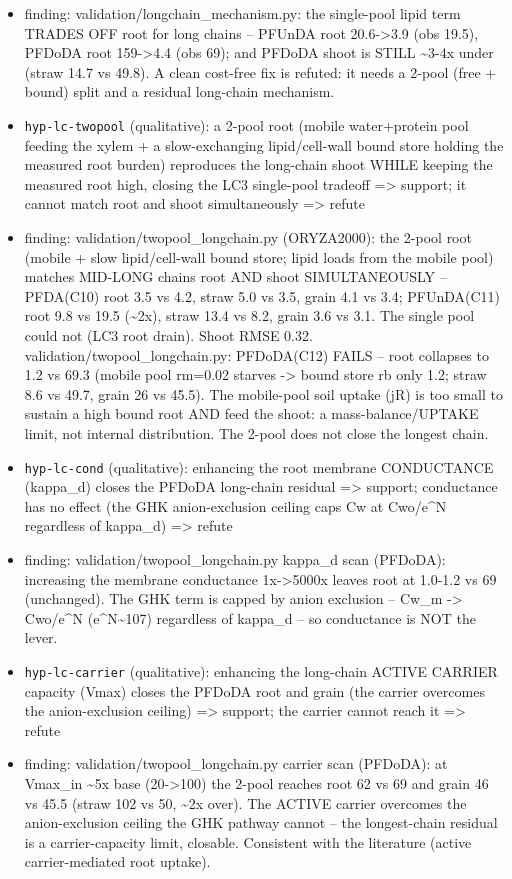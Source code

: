 \documentclass{article}
\begin{document}
\begin{itemize}
  \item finding: validation/longchain\_mechanism.py: the single-pool lipid term TRADES OFF root for long chains -- PFUnDA root 20.6->3.9 (obs 19.5), PFDoDA root 159->4.4 (obs 69); and PFDoDA shoot is STILL \textasciitilde{}3-4x under (straw 14.7 vs 49.8). A clean cost-free fix is refuted: it needs a 2-pool (free + bound) split and a residual long-chain mechanism.
  \item \texttt{hyp-lc-twopool} (qualitative): a 2-pool root (mobile water+protein pool feeding the xylem + a slow-exchanging lipid/cell-wall bound store holding the measured root burden) reproduces the long-chain shoot WHILE keeping the measured root high, closing the LC3 single-pool tradeoff => support; it cannot match root and shoot simultaneously => refute
  \item finding: validation/twopool\_longchain.py (ORYZA2000): the 2-pool root (mobile + slow lipid/cell-wall bound store; lipid loads from the mobile pool) matches MID-LONG chains root AND shoot SIMULTANEOUSLY -- PFDA(C10) root 3.5 vs 4.2, straw 5.0 vs 3.5, grain 4.1 vs 3.4; PFUnDA(C11) root 9.8 vs 19.5 (\textasciitilde{}2x), straw 13.4 vs 8.2, grain 3.6 vs 3.1. The single pool could not (LC3 root drain). Shoot RMSE 0.32.
validation/twopool\_longchain.py: PFDoDA(C12) FAILS -- root collapses to 1.2 vs 69.3 (mobile pool rm=0.02 starves -> bound store rb only 1.2; straw 8.6 vs 49.7, grain 26 vs 45.5). The mobile-pool soil uptake (jR) is too small to sustain a high bound root AND feed the shoot: a mass-balance/UPTAKE limit, not internal distribution. The 2-pool does not close the longest chain.
  \item \texttt{hyp-lc-cond} (qualitative): enhancing the root membrane CONDUCTANCE (kappa\_d) closes the PFDoDA long-chain residual => support; conductance has no effect (the GHK anion-exclusion ceiling caps Cw at Cwo/e\textasciicircum{}N regardless of kappa\_d) => refute
  \item finding: validation/twopool\_longchain.py kappa\_d scan (PFDoDA): increasing the membrane conductance 1x->5000x leaves root at 1.0-1.2 vs 69 (unchanged). The GHK term is capped by anion exclusion -- Cw\_m -> Cwo/e\textasciicircum{}N (e\textasciicircum{}N\textasciitilde{}107) regardless of kappa\_d -- so conductance is NOT the lever.
  \item \texttt{hyp-lc-carrier} (qualitative): enhancing the long-chain ACTIVE CARRIER capacity (Vmax) closes the PFDoDA root and grain (the carrier overcomes the anion-exclusion ceiling) => support; the carrier cannot reach it => refute
  \item finding: validation/twopool\_longchain.py carrier scan (PFDoDA): at Vmax\_in \textasciitilde{}5x base (20->100) the 2-pool reaches root 62 vs 69 and grain 46 vs 45.5 (straw 102 vs 50, \textasciitilde{}2x over). The ACTIVE carrier overcomes the anion-exclusion ceiling the GHK pathway cannot -- the longest-chain residual is a carrier-capacity limit, closable. Consistent with the literature (active carrier-mediated root uptake).
\end{itemize}
\end{document}

